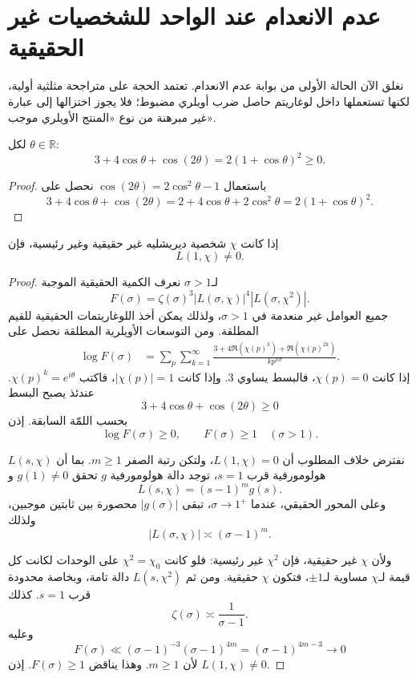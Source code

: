 \section{عدم الانعدام عند الواحد للشخصيات غير الحقيقية}

نغلق الآن الحالة الأولى من بوابة عدم الانعدام. تعتمد الحجة على متراجحة
مثلثية أولية، لكنها تستعملها داخل لوغاريتم حاصل ضرب أويلري مضبوط؛ فلا
يجوز اختزالها إلى عبارة غير مبرهنة من نوع «المنتج الأويلري موجب».

\begin{lemma}
\label{lem:dirichlet-trigonometric-inequality}
\provedhere
لكل \(\theta\in\mathbb R\):
\[
3+4\cos\theta+\cos(2\theta)
=2(1+\cos\theta)^2\geq0.
\]
\end{lemma}

\begin{proof}
باستعمال \(\cos(2\theta)=2\cos^2\theta-1\) نحصل على
\[
3+4\cos\theta+\cos(2\theta)
=2+4\cos\theta+2\cos^2\theta
=2(1+\cos\theta)^2.
\]
\end{proof}

\begin{theorem}
\label{thm:nonreal-character-nonvanishing-at-one}
\provedhere
إذا كانت \(\chi\) شخصية ديريشليه غير حقيقية وغير رئيسية، فإن
\[
L(1,\chi)\ne0.
\]
\end{theorem}

\begin{proof}
لـ\(\sigma>1\) نعرف الكمية الحقيقية الموجبة
\[
F(\sigma)
=
\zeta(\sigma)^3
|L(\sigma,\chi)|^4
|L(\sigma,\chi^2)|.
\]
جميع العوامل غير منعدمة في \(\sigma>1\)، ولذلك يمكن أخذ اللوغاريتمات
الحقيقية للقيم المطلقة. ومن التوسعات الأويلرية المطلقة نحصل على
\begin{align*}
\log F(\sigma)
&=
\sum_p\sum_{k=1}^{\infty}
\frac{3+4\Re(\chi(p)^k)+\Re(\chi(p)^{2k})}
{k p^{k\sigma}}.
\end{align*}
إذا كانت \(\chi(p)=0\)، فالبسط يساوي \(3\). وإذا كانت
\(|\chi(p)|=1\)، فاكتب \(\chi(p)^k=e^{i\theta}\). عندئذ يصبح البسط
\[
3+4\cos\theta+\cos(2\theta)\geq0
\]
بحسب اللمّة السابقة. إذن
\[
\log F(\sigma)\geq0,
\qquad
F(\sigma)\geq1
\quad(\sigma>1).
\]

نفترض خلاف المطلوب أن \(L(1,\chi)=0\)، ولتكن رتبة الصفر \(m\geq1\).
بما أن \(L(s,\chi)\) هولومورفية قرب \(s=1\)، توجد دالة هولومورفية
\(g\) تحقق \(g(1)\ne0\) و
\[
L(s,\chi)=(s-1)^m g(s).
\]
وعلى المحور الحقيقي، عندما \(\sigma\to1^+\)، تبقى \(|g(\sigma)|\)
محصورة بين ثابتين موجبين، ولذلك
\[
|L(\sigma,\chi)|\asymp(\sigma-1)^m.
\]

ولأن \(\chi\) غير حقيقية، فإن \(\chi^2\) غير رئيسية: فلو كانت
\(\chi^2=\chi_0\) على الوحدات لكانت كل قيمة لـ\(\chi\) مساوية
لـ\(\pm1\)، فتكون \(\chi\) حقيقية. ومن ثم \(L(s,\chi^2)\) دالة تامة،
وبخاصة محدودة قرب \(s=1\). كذلك
\[
\zeta(\sigma)\asymp\frac1{\sigma-1}.
\]
وعليه
\[
F(\sigma)
\ll
(\sigma-1)^{-3}(\sigma-1)^{4m}
=
(\sigma-1)^{4m-3}
\longrightarrow0
\]
لأن \(m\geq1\). وهذا يناقض \(F(\sigma)\geq1\). إذن
\(L(1,\chi)\ne0\).
\end{proof}

